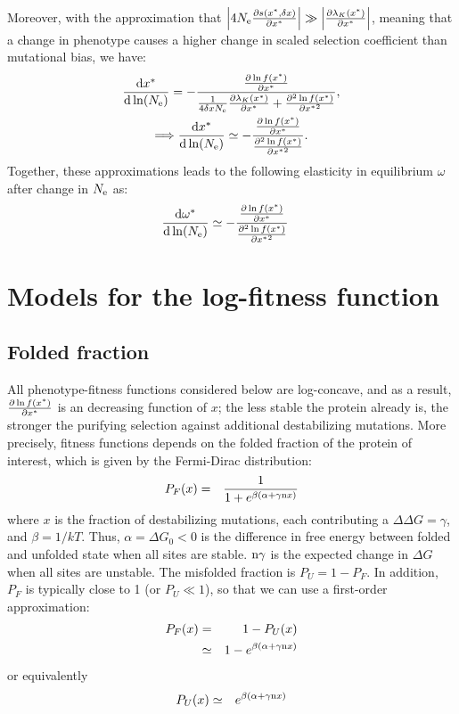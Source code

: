 \documentclass{article}
\begin{document}
Moreover, with the approximation that $\left| 4 N_{\mathrm{e}} \frac{ \partial s(x^{*}, \delta x) }{\partial x^{*} } \right| \gg \left| \frac{\partial \lambda_K (x^{*}) }{\partial x^{*} } \right|$, meaning that a change in phenotype causes a higher change in scaled selection coefficient than mutational bias, we have:
\begin{gather}
\frac{ \mathrm{d} x^{*}}{\mathrm{d} \ln (N_{\mathrm{e}})}  = - \frac{\frac{ \partial \ln f(x^{*}) }{\partial {x^{*}}}}{\frac{1}{4 \delta x N_{\mathrm{e}}} \frac{\partial \lambda_K (x^{*}) }{\partial x^{*} } + \frac{ \partial^2 \ln f(x^{*}) }{\partial {x^{*}}^2}},\\
\Longrightarrow \frac{ \mathrm{d} x^{*}}{\mathrm{d} \ln (N_{\mathrm{e}})}  \simeq - \frac{\frac{ \partial \ln f(x^{*}) }{\partial {x^{*}}}}{\frac{ \partial^2 \ln f(x^{*}) }{\partial {x^{*}}^2}}. \label{eq:approx_dx_dlnNe}
\end{gather}
Together, these approximations leads to the following elasticity in equilibrium $\omega$ after change in $N_{\mathrm{e}}$ as:
\begin{align}
\frac{ \mathrm{d} \omega^{*}}{\mathrm{d} \ln (N_{\mathrm{e}})} & \simeq - \frac{\frac{ \partial \ln f(x^{*}) }{\partial {x^{*}}}}{\frac{ \partial^2 \ln f(x^{*}) }{\partial {x^{*}}^2}}\label{eq:approx_dw_dlnNe}
\end{align}
\section{Models for the log-fitness function}
\subsection{Folded fraction}
All phenotype-fitness functions considered below are log-concave, and as a result, $\frac{ \partial \ln f(x^{*}) }{\partial {x^{*}}}$ is an decreasing function of $x$; the less stable the protein already is, the stronger the purifying selection against additional destabilizing mutations. More precisely, fitness functions depends on the folded fraction of the protein of interest, which is given by the Fermi-Dirac distribution:
\begin{eqnarray}
P_{F} (x) &=& \frac{1}{1 + e^{\beta(\alpha + \gamma \text{n} x)}}
\end{eqnarray}
where $x$ is the fraction of destabilizing mutations, each contributing a $\Delta \Delta G = \gamma$, and $\beta = 1 / kT$. Thus, $\alpha = \Delta G_0 < 0$ is the difference in free energy between folded and unfolded state when all sites are stable. $\text{n} \gamma$ is the expected change in $\Delta G$ when all sites are unstable. The misfolded fraction is  $P_{U} = 1-P_{F}$. In addition, $P_{F}$ is typically close to 1 (or $P_{U} \ll 1$), so that we can use a first-order approximation:
\begin{eqnarray}
P_{F}(x) &=& 1 - P_{U}(x) \\
&\simeq& 1 - e^{\beta(\alpha + \gamma \text{n} x)}
\end{eqnarray}
or equivalently
\begin{eqnarray}
P_{U}(x) &\simeq& e^{\beta(\alpha + \gamma \text{n} x)}
\end{eqnarray}
\end{document}
